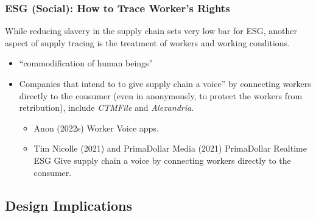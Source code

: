 \documentclass[
  letterpaper,
  DIV=11,
  numbers=noendperiod]{scrartcl}
\providecommand{\tightlist}{%
  \setlength{\itemsep}{0pt}\setlength{\parskip}{0pt}}\usepackage{longtable,booktabs,array}
\begin{document}
\subsubsection{ESG (Social): How to Trace Worker's
Rights}\label{esg-social-how-to-trace-workers-rights}

While reducing slavery in the supply chain sets very low bar for ESG,
another aspect of supply tracing is the treatment of workers and working
conditions.

\begin{itemize}
\item
  ``commodification of human beings''
\item
  Companies that intend to to give supply chain a voice'' by connecting
  workers directly to the consumer (even in anonymously, to protect the
  workers from retribution), include \emph{CTMFile} and
  \emph{Alexandria}.

  \begin{itemize}
  \tightlist
  \item
    Anon (2022s) Worker Voice apps.
  \item
    Tim Nicolle (2021) and PrimaDollar Media (2021) PrimaDollar Realtime
    ESG Give supply chain a voice by connecting workers directly to the
    consumer.
  \end{itemize}
\end{itemize}

\subsection{Design Implications}\label{design-implications-4}
\end{document}
